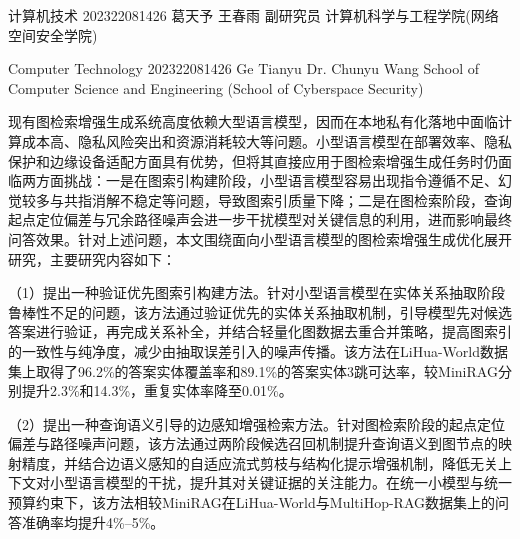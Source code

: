 \documentclass[promaster, vlined]{DissertUESTC}
\begin{document}
            {计算机技术}
            {202322081426}
            {葛天予}
            {王春雨}
            {副研究员}
            {计算机科学与工程学院(网络空间安全学院)}

	\Date{}{}  %
	\Reviewer{}{}  %
	\uestczhtitlepage
	

                {Computer Technology}
                {202322081426}
                {Ge Tianyu}
                {Dr. Chunyu Wang}{}
                {School of Computer Science and Engineering (School of Cyberspace Security)}

\zhabstract
现有图检索增强生成系统高度依赖大型语言模型，因而在本地私有化落地中面临计算成本高、隐私风险突出和资源消耗较大等问题。小型语言模型在部署效率、隐私保护和边缘设备适配方面具有优势，但将其直接应用于图检索增强生成任务时仍面临两方面挑战：一是在图索引构建阶段，小型语言模型容易出现指令遵循不足、幻觉较多与共指消解不稳定等问题，导致图索引质量下降；二是在图检索阶段，查询起点定位偏差与冗余路径噪声会进一步干扰模型对关键信息的利用，进而影响最终问答效果。针对上述问题，本文围绕面向小型语言模型的图检索增强生成优化展开研究，主要研究内容如下：

（1）提出一种验证优先图索引构建方法。针对小型语言模型在实体关系抽取阶段鲁棒性不足的问题，该方法通过验证优先的实体关系抽取机制，引导模型先对候选答案进行验证，再完成关系补全，并结合轻量化图数据去重合并策略，提高图索引的一致性与纯净度，减少由抽取误差引入的噪声传播。该方法在LiHua-World数据集上取得了96.2\%的答案实体覆盖率和89.1\%的答案实体3跳可达率，较MiniRAG分别提升2.3\%和14.3\%，重复实体率降至0.01\%。

（2）提出一种查询语义引导的边感知增强检索方法。针对图检索阶段的起点定位偏差与路径噪声问题，该方法通过两阶段候选召回机制提升查询语义到图节点的映射精度，并结合边语义感知的自适应流式剪枝与结构化提示增强机制，降低无关上下文对小型语言模型的干扰，提升其对关键证据的关注能力。在统一小模型与统一预算约束下，该方法相较MiniRAG在LiHua-World与MultiHop-RAG数据集上的问答准确率均提升4\%--5\%。
\end{document}
